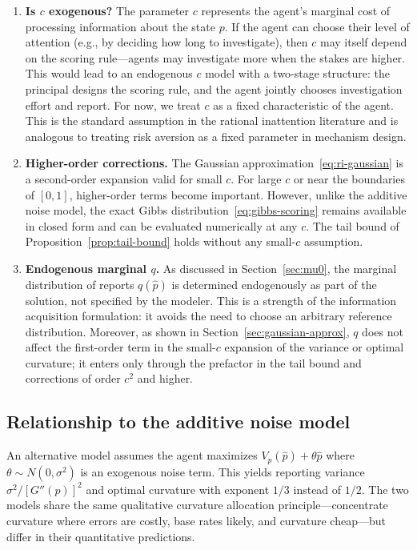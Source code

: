 \documentclass[11pt]{article}
\begin{document}
\begin{enumerate}
\item \textbf{Is $c$ exogenous?} The parameter $c$ represents the agent's marginal cost of processing information about the state $p$. If the agent can choose their level of attention (e.g., by deciding how long to investigate), then $c$ may itself depend on the scoring rule---agents may investigate more when the stakes are higher. This would lead to an endogenous $c$ model with a two-stage structure: the principal designs the scoring rule, and the agent jointly chooses investigation effort and report. For now, we treat $c$ as a fixed characteristic of the agent. This is the standard assumption in the rational inattention literature and is analogous to treating risk aversion as a fixed parameter in mechanism design.

\item \textbf{Higher-order corrections.} The Gaussian approximation~\eqref{eq:ri-gaussian} is a second-order expansion valid for small $c$. For large $c$ or near the boundaries of $[0,1]$, higher-order terms become important. However, unlike the additive noise model, the exact Gibbs distribution~\eqref{eq:gibbs-scoring} remains available in closed form and can be evaluated numerically at any $c$. The tail bound of Proposition~\ref{prop:tail-bound} holds without any small-$c$ assumption.

\item \textbf{Endogenous marginal $q$.} As discussed in Section~\ref{sec:mu0}, the marginal distribution of reports $q(\hat{p})$ is determined endogenously as part of the solution, not specified by the modeler. This is a strength of the information acquisition formulation: it avoids the need to choose an arbitrary reference distribution. Moreover, as shown in Section~\ref{sec:gaussian-approx}, $q$ does not affect the first-order term in the small-$c$ expansion of the variance or optimal curvature; it enters only through the prefactor in the tail bound and corrections of order $c^2$ and higher.
\end{enumerate}

\subsection{Relationship to the additive noise model}

An alternative model assumes the agent maximizes $V_p(\hat{p}) + \theta\hat{p}$ where $\theta \sim N(0,\sigma^2)$ is an exogenous noise term. This yields reporting variance $\sigma^2/[G''(p)]^2$ and optimal curvature with exponent $1/3$ instead of $1/2$. The two models share the same qualitative curvature allocation principle---concentrate curvature where errors are costly, base rates likely, and curvature cheap---but differ in their quantitative predictions.
\end{document}
